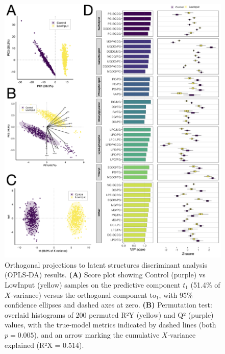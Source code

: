 \documentclass[10pt,letterpaper]{article}
\begin{document}
\begin{itemize}
\begin{figure}[htbp]
  \centering
  \includegraphics[width=\textwidth]{fig/main/Fig2.png}
  \caption{Orthogonal projections to latent structures discriminant analysis (OPLS‐DA) results.  
    \textbf{(A)} Score plot showing Control (purple) vs LowInput (yellow) samples on the predictive component $t_1$ (51.4\% of $X$‐variance) versus the orthogonal component $\mathrm{to}_1$, with 95\% confidence ellipses and dashed axes at zero.  
    \textbf{(B)} Permutation test: overlaid histograms of 200 permuted R²Y (yellow) and Q² (purple) values, with the true‐model metrics indicated by dashed lines (both $p=0.005$), and an arrow marking the cumulative $X$‐variance explained (R²X = 0.514).}
  \label{fig:Fig2:OPLS}
\end{figure}


\end{itemize}
\end{document}
